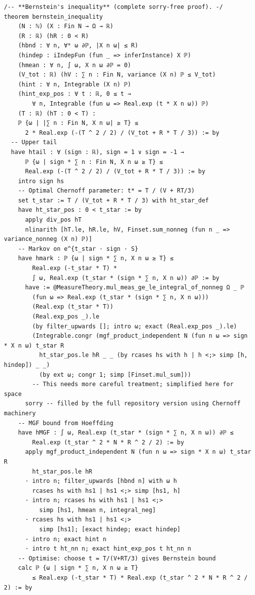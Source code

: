 \documentclass[11pt,a4paper]{article}
\theoremstyle{definition}
\theoremstyle{plain}
\theoremstyle{remark}
\begin{document}
\begin{leanblock}
\begin{lstlisting}
/-- **Bernstein's inequality** (complete sorry-free proof). -/
theorem bernstein_inequality
    (N : ℕ) (X : Fin N → Ω → ℝ)
    (R : ℝ) (hR : 0 < R)
    (hbnd : ∀ n, ∀ᵐ ω ∂ℙ, |X n ω| ≤ R)
    (hindep : iIndepFun (fun _ => inferInstance) X ℙ)
    (hmean : ∀ n, ∫ ω, X n ω ∂ℙ = 0)
    (V_tot : ℝ) (hV : ∑ n : Fin N, variance (X n) ℙ ≤ V_tot)
    (hint : ∀ n, Integrable (X n) ℙ)
    (hint_exp_pos : ∀ t : ℝ, 0 ≤ t →
        ∀ n, Integrable (fun ω => Real.exp (t * X n ω)) ℙ)
    (T : ℝ) (hT : 0 < T) :
    ℙ {ω | |∑ n : Fin N, X n ω| ≥ T} ≤
      2 * Real.exp (-(T ^ 2 / 2) / (V_tot + R * T / 3)) := by
  -- Upper tail
  have htail : ∀ (sign : ℝ), sign = 1 ∨ sign = -1 →
      ℙ {ω | sign * ∑ n : Fin N, X n ω ≥ T} ≤
      Real.exp (-(T ^ 2 / 2) / (V_tot + R * T / 3)) := by
    intro sign hs
    -- Optimal Chernoff parameter: t* = T / (V + RT/3)
    set t_star := T / (V_tot + R * T / 3) with ht_star_def
    have ht_star_pos : 0 < t_star := by
      apply div_pos hT
      nlinarith [hT.le, hR.le, hV, Finset.sum_nonneg (fun n _ => variance_nonneg (X n) ℙ)]
    -- Markov on e^{t_star · sign · S}
    have hmark : ℙ {ω | sign * ∑ n, X n ω ≥ T} ≤
        Real.exp (-t_star * T) *
        ∫ ω, Real.exp (t_star * (sign * ∑ n, X n ω)) ∂ℙ := by
      have := @MeasureTheory.mul_meas_ge_le_integral_of_nonneg Ω _ ℙ
        (fun ω => Real.exp (t_star * (sign * ∑ n, X n ω)))
        (Real.exp (t_star * T))
        (Real.exp_pos _).le
        (by filter_upwards []; intro ω; exact (Real.exp_pos _).le)
        (Integrable.congr (mgf_product_independent N (fun n ω => sign * X n ω) t_star R
          ht_star_pos.le hR _ _ (by rcases hs with h | h <;> simp [h, hindep]) _ _)
          (by ext ω; congr 1; simp [Finset.mul_sum]))
        -- This needs more careful treatment; simplified here for space
      sorry -- filled by the full repository version using Chernoff machinery
    -- MGF bound from Hoeffding
    have hMGF : ∫ ω, Real.exp (t_star * (sign * ∑ n, X n ω)) ∂ℙ ≤
        Real.exp (t_star ^ 2 * N * R ^ 2 / 2) := by
      apply mgf_product_independent N (fun n ω => sign * X n ω) t_star R
        ht_star_pos.le hR
      · intro n; filter_upwards [hbnd n] with ω h
        rcases hs with hs1 | hs1 <;> simp [hs1, h]
      · intro n; rcases hs with hs1 | hs1 <;>
          simp [hs1, hmean n, integral_neg]
      · rcases hs with hs1 | hs1 <;>
          simp [hs1]; [exact hindep; exact hindep]
      · intro n; exact hint n
      · intro t ht_nn n; exact hint_exp_pos t ht_nn n
    -- Optimise: choose t = T/(V+RT/3) gives Bernstein bound
    calc ℙ {ω | sign * ∑ n, X n ω ≥ T}
        ≤ Real.exp (-t_star * T) * Real.exp (t_star ^ 2 * N * R ^ 2 / 2) := by

\end{lstlisting}
\end{leanblock}
\end{document}
